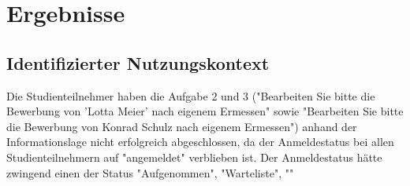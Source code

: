 \section{Ergebnisse}
%


\subsection{Identifizierter Nutzungskontext}


    


Die Studienteilnehmer haben die Aufgabe 2 und 3 ("Bearbeiten Sie bitte die Bewerbung von 'Lotta Meier' nach eigenem Ermessen" sowie "Bearbeiten Sie bitte die Bewerbung von Konrad Schulz nach eigenem Ermessen") anhand der Informationslage nicht erfolgreich abgeschlossen, da der Anmeldestatus bei allen Studienteilnehmern auf "angemeldet" verblieben ist. Der Anmeldestatus hätte zwingend einen der Status "Aufgenommen", "Warteliste", ""

